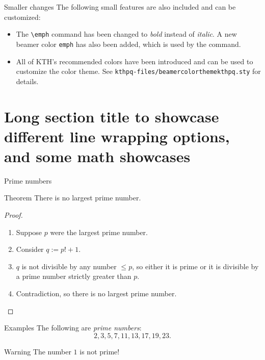\documentclass[17pt, t, lualatex]{beamer}
\begin{document}
\begin{frame}[fragile=singleslide]{Smaller changes}
The following small features are also included and can be customized:
\begin{itemize}
\item The \verb|\emph| command has been changed to \emph{bold} instead of \textit{ italic}. A new beamer color \verb|emph| has also been added, which is used by the command.
\item All of KTH's recommended colors have been introduced and can be used to customize the color theme. See \texttt{kthpq-files/beamercolorthemekthpq.sty} for details.
\end{itemize}
\end{frame}

\section{Long section title to showcase different line wrapping options, and some math showcases}

\insertsectionpage


\begin{frame}{Prime numbers}
\begin{block}{Theorem}
There is no largest prime number.
\end{block}

\begin{proof}
\begin{enumerate}
\item Suppose $p$ were the largest prime number.
\item Consider $q := p! + 1$.
\item $q$ is not divisible by any number $\leq p$, so either it is prime or it is divisible by a prime number strictly greater than $p$.
\item Contradiction, so there is no largest prime number.
\end{enumerate}
\end{proof}
\end{frame}

\begin{frame}
\begin{exampleblock}{Examples}
The following are \emph{prime numbers}:
\[
2, 3, 5, 7, 11, 13, 17, 19, 23.
\]
\end{exampleblock}

\begin{alertblock}{Warning}
The number $1$ is not prime!
\end{alertblock}
\end{frame}
\end{document}
